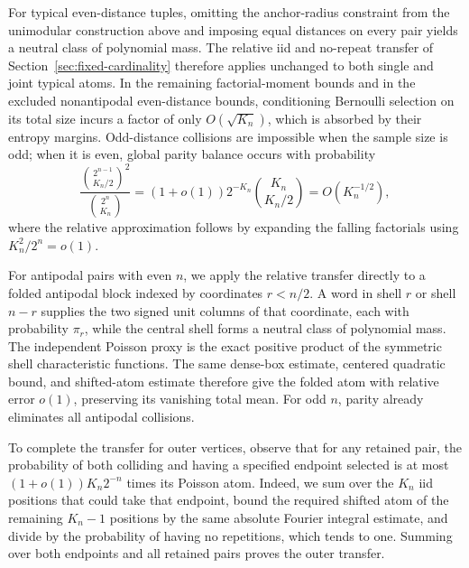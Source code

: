 For typical even-distance tuples, omitting the anchor-radius constraint from the unimodular construction above and imposing equal distances on every pair yields a neutral class of polynomial mass. The relative iid and no-repeat transfer of Section~\ref{sec:fixed-cardinality} therefore applies unchanged to both single and joint typical atoms. In the remaining factorial-moment bounds and in the excluded nonantipodal even-distance bounds, conditioning Bernoulli selection on its total size incurs a factor of only \(O(\sqrt{K_n})\), which is absorbed by their entropy margins. Odd-distance collisions are impossible when the sample size is odd; when it is even, global parity balance occurs with probability
\[
 \frac{\binom{2^{n-1}}{K_n/2}^2}{\binom{2^n}{K_n}}
 =(1+o(1))2^{-K_n}\binom{K_n}{K_n/2}
 =O(K_n^{-1/2}),
\]
where the relative approximation follows by expanding the falling factorials using \(K_n^2/2^n=o(1)\).

For antipodal pairs with even \(n\), we apply the relative transfer directly to a folded antipodal block indexed by coordinates \(r<n/2\). A word in shell \(r\) or shell \(n-r\) supplies the two signed unit columns of that coordinate, each with probability \(\pi_r\), while the central shell forms a neutral class of polynomial mass. The independent Poisson proxy is the exact positive product of the symmetric shell characteristic functions. The same dense-box estimate, centered quadratic bound, and shifted-atom estimate therefore give the folded atom with relative error \(o(1)\), preserving its vanishing total mean. For odd \(n\), parity already eliminates all antipodal collisions.

To complete the transfer for outer vertices, observe that for any retained pair, the probability of both colliding and having a specified endpoint selected is at most \((1+o(1))K_n2^{-n}\) times its Poisson atom. Indeed, we sum over the \(K_n\) iid positions that could take that endpoint, bound the required shifted atom of the remaining \(K_n-1\) positions by the same absolute Fourier integral estimate, and divide by the probability of having no repetitions, which tends to one. Summing over both endpoints and all retained pairs proves the outer transfer.

